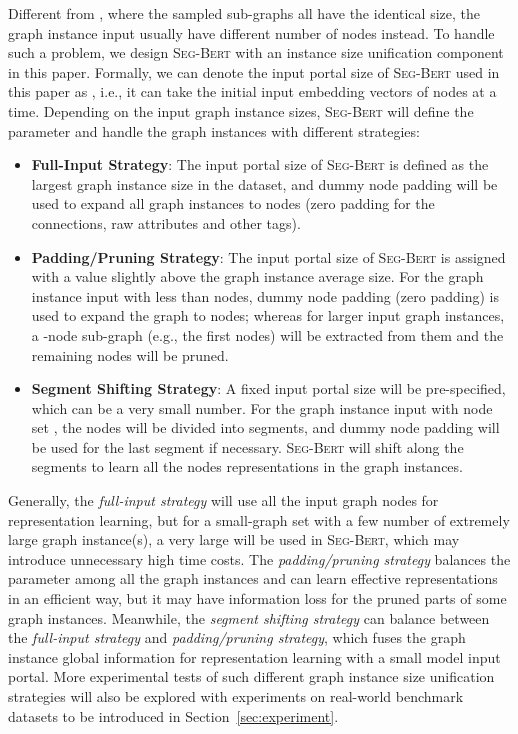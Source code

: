 \documentclass{article}
\newcommand{\our}{\textsc{Seg-Bert}}
\begin{document}
Different from \cite{zhang2020graph}, where the sampled sub-graphs all have the identical size, the graph instance input usually have different number of nodes instead. To handle such a problem, we design {\our} with an instance size unification component in this paper. Formally, we can denote the input portal size of {\our} used in this paper as , i.e., it can take the initial input embedding vectors of  nodes at a time. Depending on the input graph instance sizes, {\our} will define the parameter  and handle the graph instances with different strategies:
\begin{itemize}
\item \textbf{Full-Input Strategy}: The input portal size  of {\our} is defined as the largest graph instance size in the dataset, and dummy node padding will be used to expand all graph instances to  nodes (zero padding for the connections, raw attributes and other tags).

\item \textbf{Padding/Pruning Strategy}: The input portal size  of {\our} is assigned with a value slightly above the graph instance average size. For the graph instance input with less than  nodes, dummy node padding (zero padding) is used to expand the graph to  nodes; whereas for larger input graph instances, a -node sub-graph (e.g., the first  nodes) will be extracted from them and the remaining nodes will be pruned.

\item \textbf{Segment Shifting Strategy}: A fixed input portal size  will be pre-specified, which can be a very small number. For the graph instance input with node set , the nodes will be divided into  segments, and dummy node padding will be used for the last segment if necessary. {\our} will shift along the segments to learn all the nodes representations in the graph instances.
\end{itemize}

Generally, the \textit{full-input strategy} will use all the input graph nodes for representation learning, but for a small-graph set with a few number of extremely large graph instance(s), a very large  will be used in {\our}, which may introduce unnecessary high time costs. The \textit{padding/pruning strategy} balances the parameter  among all the graph instances and can learn effective representations in an efficient way, but it may have information loss for the pruned parts of some graph instances. Meanwhile, the \textit{segment shifting strategy} can balance between the \textit{full-input strategy} and \textit{padding/pruning strategy}, which fuses the graph instance global information for representation learning with a small model input portal. More experimental tests of such different graph instance size unification strategies will also be explored with experiments on real-world benchmark datasets to be introduced in Section~\ref{sec:experiment}.
\end{document}
